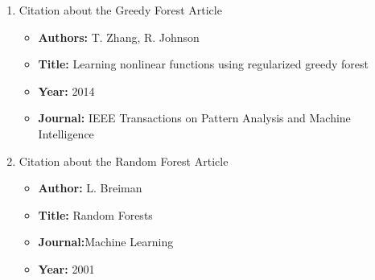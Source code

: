 \documentclass[11pt]{article}
\begin{document}
    \begin{enumerate}
        \item Citation about the Greedy Forest Article
        \begin{itemize}
        \item \textbf{Authors:} T. Zhang, R. Johnson
        \item \textbf{Title:} Learning nonlinear functions using regularized greedy forest
        \item \textbf{Year:} 2014
        \item \textbf{Journal:} IEEE Transactions on Pattern Analysis and Machine Intelligence
        \end{itemize}

        \item Citation about the Random Forest Article
        \begin{itemize}
        \item \textbf{Author:} L. Breiman
        \item \textbf{Title:} Random Forests 
        \item \textbf{Journal:}Machine Learning
        \item \textbf{Year:} 2001
        \end{itemize}
        
    \end{enumerate}
    
    
    
    
\end{document}
